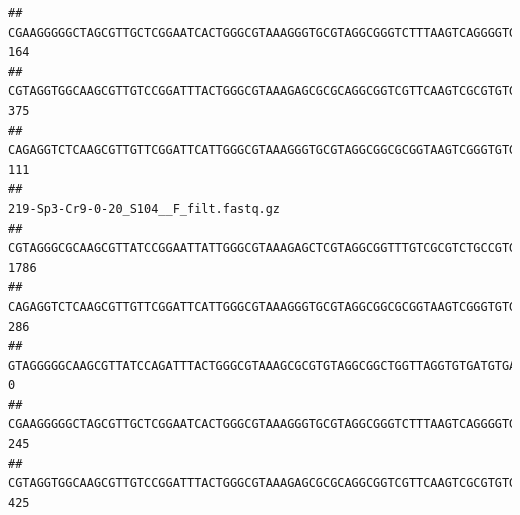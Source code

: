 \documentclass[]{article}
\begin{document}
\begin{verbatim}
## CGAAGGGGGCTAGCGTTGCTCGGAATCACTGGGCGTAAAGGGTGCGTAGGCGGGTCTTTAAGTCAGGGGTGAAATCCTGGAGCTCAACTCCAGAACTGCCTTTGATACTGAAGATCTTGAGTTCGGGAGAGGTGAGTGGAACTGCGAGTGTAGAGGTGAAATTCGTAGATATTCGCAAGAACACCAGTGGCGAAGGCGGCTCACTGGCCCGATACTGACGCTGAGGCACGAAAGCGTGGGGAGCAAACA                                    164
## CGTAGGTGGCAAGCGTTGTCCGGATTTACTGGGCGTAAAGAGCGCGCAGGCGGTCGTTCAAGTCGCGTGTGAAAGCCCCCGGCTCAACTGGGGAGGGTCACGCGATACTGATCGACTCGAAGGCAGGAGAGGGTAGTGGAATTCCCGGTGTAGTGGTGAAATGCGTAGATATCGGGAGGAACACCAGTGGCGAAGGCGACTACCTGGCCTGTTCTTGACGCTGAGGCGCGAAAGCTAGGGGAGCAAACG                                    375
## CAGAGGTCTCAAGCGTTGTTCGGATTCATTGGGCGTAAAGGGTGCGTAGGCGGCGCGGTAAGTCGGGTGTGAAATCTCGGGGCTTAACTCCGAAACTGCATTCGATACTGCCGTGCTTGAGGACTGGAGAGGAGACTGGAATTTACGGTGTAGCGGTGAAATGCGTAGATATCGTAAGGAAGACCAGTGGCGAAGGCGGGTCTCTGGACAGTTCCTGACGCTGAGGCACGAAGGCCAGGGGAGCAAACG                                    111
##                                                                                                                                                                                                                                                           219-Sp3-Cr9-0-20_S104__F_filt.fastq.gz
## CGTAGGGCGCAAGCGTTATCCGGAATTATTGGGCGTAAAGAGCTCGTAGGCGGTTTGTCGCGTCTGCCGTGAAAGTCCGGGGCTCAACTCCGGATCTGCGGTGGGTACGGGCAGACTAGAGTGATGTAGGGGAGACTGGAATTCCTGGTGTAGCGGTGAAATGCGCAGATATCAGGAGGAACACCGATGGCGAAGGCAGGTCTCTGGGCATTAACTGACGCTGAGGAGCGAAAGCATGGGGAGCGAACA                                   1786
## CAGAGGTCTCAAGCGTTGTTCGGATTCATTGGGCGTAAAGGGTGCGTAGGCGGCGCGGTAAGTCGGGTGTGAAATCTCGGAGCTTAACTCCGAAACTGCATTCGATACTGCCGTGCTTGAGGACTGGAGAGGAGACTGGAATTTACGGTGTAGCGGTGAAATGCGTAGATATCGTAAGGAAGACCAGTGGCGAAGGCGGGTCTCTGGACAGTTCCTGACGCTGAGGCACGAAGGCCAGGGGAGCAAACG                                    286
## GTAGGGGGCAAGCGTTATCCAGATTTACTGGGCGTAAAGCGCGTGTAGGCGGCTGGTTAGGTGTGATGTGAAATCTTCCGGCTCAACCGGAAAACTGCATTGCAAACCGGCCTGGCTAGAGTGCAGGAGAGGGAAGCGGAATTCCAGGTGTAGCGGTGAAATGCGTAGATATCTGGAGGAACACCAGTGGCGAAGGCGGCTTCCTGGCCTGCAACTGACGCTGAGACGCGAAAGCGTGGGGAGCGAAC                                       0
## CGAAGGGGGCTAGCGTTGCTCGGAATCACTGGGCGTAAAGGGTGCGTAGGCGGGTCTTTAAGTCAGGGGTGAAATCCTGGAGCTCAACTCCAGAACTGCCTTTGATACTGAAGATCTTGAGTTCGGGAGAGGTGAGTGGAACTGCGAGTGTAGAGGTGAAATTCGTAGATATTCGCAAGAACACCAGTGGCGAAGGCGGCTCACTGGCCCGATACTGACGCTGAGGCACGAAAGCGTGGGGAGCAAACA                                    245
## CGTAGGTGGCAAGCGTTGTCCGGATTTACTGGGCGTAAAGAGCGCGCAGGCGGTCGTTCAAGTCGCGTGTGAAAGCCCCCGGCTCAACTGGGGAGGGTCACGCGATACTGATCGACTCGAAGGCAGGAGAGGGTAGTGGAATTCCCGGTGTAGTGGTGAAATGCGTAGATATCGGGAGGAACACCAGTGGCGAAGGCGACTACCTGGCCTGTTCTTGACGCTGAGGCGCGAAAGCTAGGGGAGCAAACG                                    425

\end{verbatim}
\end{document}
